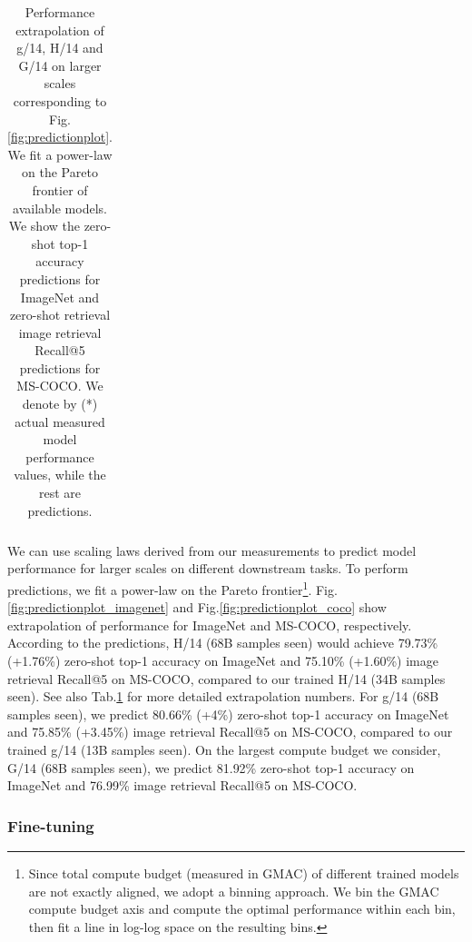 \begin{appendix}
\begin{table}
\begin{tabular}{cll}
\bottomrule
\end{tabular}
\caption{Performance extrapolation of g/14, H/14 and G/14 on larger scales corresponding to Fig.\ref{fig:predictionplot}. We fit a
power-law on the Pareto frontier of available models. We show the zero-shot top-1 accuracy predictions for ImageNet and zero-shot retrieval image retrieval Recall@5 predictions for MS-COCO. We denote by  (*) actual measured model performance values, while the rest are predictions.}
\label{table:predictions}
\end{table}



We can use scaling laws derived from our measurements to predict model performance for larger scales on different downstream tasks. To perform predictions, we fit a power-law on the Pareto frontier\footnote{Since total compute budget (measured in GMAC) of different trained models are not exactly aligned, we adopt a binning approach. We bin the GMAC compute budget axis and compute the optimal performance within each bin, then fit a line in log-log space on the resulting bins.}.  Fig.\ref{fig:predictionplot_imagenet} and Fig.\ref{fig:predictionplot_coco} show extrapolation of performance for ImageNet and MS-COCO, respectively. According to the predictions, H/14 (68B samples seen) would achieve 79.73\% (+1.76\%) zero-shot top-1 accuracy on ImageNet and 75.10\% (+1.60\%) image retrieval Recall@5 on MS-COCO, compared to our trained H/14 (34B samples seen).  See also Tab.\ref{table:predictions} for more detailed extrapolation numbers.
For g/14 (68B samples seen), we predict 80.66\% (+4\%) zero-shot top-1 accuracy on ImageNet and 75.85\% (+3.45\%) image retrieval Recall@5 on MS-COCO, compared to our trained g/14 (13B samples seen). 
On the largest compute budget we consider, G/14 (68B samples seen), we predict 81.92\%  zero-shot top-1 accuracy on ImageNet and 76.99\% image retrieval Recall@5 on MS-COCO.



\subsubsection{Fine-tuning}
\label{sec:appendix:finetuning}


\end{appendix}
